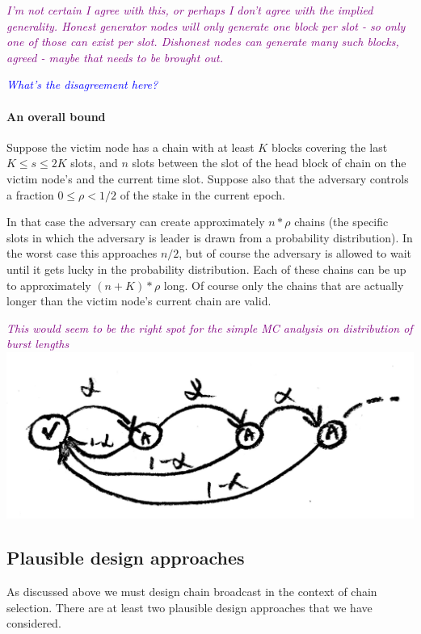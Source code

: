 \documentclass{article}
\newcommand{\njd}[1]{\textcolor{purple}{\emph{#1}}}
\newcommand{\avieth}[1]{\textcolor{blue}{\emph{#1}}}
\theoremstyle{definition}{
  \newtheorem{lemma}{Lemma}[section] %
  \newtheorem{definition}[lemma]{Definition}
}
\theoremstyle{theorem}{
  \newtheorem{invariant}[lemma]{Invariant}
  \newtheorem{proofobligation}[lemma]{Proof Obligation}
}
\numberwithin{equation}{lemma}
\begin{document}
\njd{\centering I'm not certain I agree with this, or perhaps I don't agree
  with the implied generality. Honest generator nodes will only generate one
  block per slot - so only one of those can exist per slot. Dishonest nodes can
  generate many such blocks, agreed - maybe that needs to be brought out.}

\avieth{What's the disagreement here?}

\paragraph{An overall bound} Suppose the victim node has a chain with
at least $K$ blocks covering the last $K \leq s \leq 2K$ slots, and $n$ slots
between the slot of the head block of chain on the victim node's and the
current time slot. Suppose also that the adversary controls a fraction
$0 \leq \rho < 1/2$ of the stake in the current epoch.

In that case the adversary can create approximately $n * \rho$ chains (the
specific slots in which the adversary is leader is drawn from a probability
distribution). In the worst case this approaches $n / 2$, but of course the
adversary is allowed to wait until it gets lucky in the probability
distribution. Each of these chains can be up to approximately $(n+K) * \rho$
long. Of course only the chains that are actually longer than the victim node's
current chain are valid.

\njd{This would seem to be the right spot for the simple MC analysis on
  distribution of burst lengths\\
\includegraphics[totalheight=2cm]{burst-length-mc.png}}

\subsection{Plausible design approaches}

As discussed above we must design chain broadcast in the context of chain
selection. There are at least two plausible design approaches that we have
considered.
\end{document}
